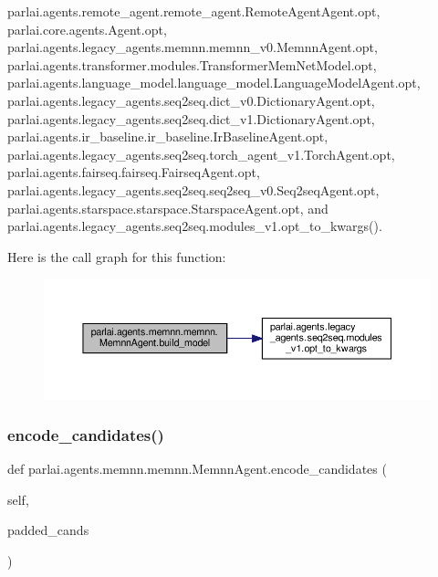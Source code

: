 parlai.\+agents.\+remote\+\_\+agent.\+remote\+\_\+agent.\+Remote\+Agent\+Agent.\+opt, parlai.\+core.\+agents.\+Agent.\+opt, parlai.\+agents.\+legacy\+\_\+agents.\+memnn.\+memnn\+\_\+v0.\+Memnn\+Agent.\+opt, parlai.\+agents.\+transformer.\+modules.\+Transformer\+Mem\+Net\+Model.\+opt, parlai.\+agents.\+language\+\_\+model.\+language\+\_\+model.\+Language\+Model\+Agent.\+opt, parlai.\+agents.\+legacy\+\_\+agents.\+seq2seq.\+dict\+\_\+v0.\+Dictionary\+Agent.\+opt, parlai.\+agents.\+legacy\+\_\+agents.\+seq2seq.\+dict\+\_\+v1.\+Dictionary\+Agent.\+opt, parlai.\+agents.\+ir\+\_\+baseline.\+ir\+\_\+baseline.\+Ir\+Baseline\+Agent.\+opt, parlai.\+agents.\+legacy\+\_\+agents.\+seq2seq.\+torch\+\_\+agent\+\_\+v1.\+Torch\+Agent.\+opt, parlai.\+agents.\+fairseq.\+fairseq.\+Fairseq\+Agent.\+opt, parlai.\+agents.\+legacy\+\_\+agents.\+seq2seq.\+seq2seq\+\_\+v0.\+Seq2seq\+Agent.\+opt, parlai.\+agents.\+starspace.\+starspace.\+Starspace\+Agent.\+opt, and parlai.\+agents.\+legacy\+\_\+agents.\+seq2seq.\+modules\+\_\+v1.\+opt\+\_\+to\+\_\+kwargs().

Here is the call graph for this function\+:
\nopagebreak
\begin{figure}[H]
\begin{center}
\leavevmode
\includegraphics[width=350pt]{classparlai_1_1agents_1_1memnn_1_1memnn_1_1MemnnAgent_aa5b5782548443a008c0502ec9ddedee2_cgraph}
\end{center}
\end{figure}
\mbox{\label{classparlai_1_1agents_1_1memnn_1_1memnn_1_1MemnnAgent_ab0c47ca129aeec437446202c941e0a56}} 
\subsubsection{\texorpdfstring{encode\+\_\+candidates()}{encode\_candidates()}}
{\footnotesize\ttfamily def parlai.\+agents.\+memnn.\+memnn.\+Memnn\+Agent.\+encode\+\_\+candidates (\begin{DoxyParamCaption}\item[{}]{self,  }\item[{}]{padded\+\_\+cands }\end{DoxyParamCaption})}



